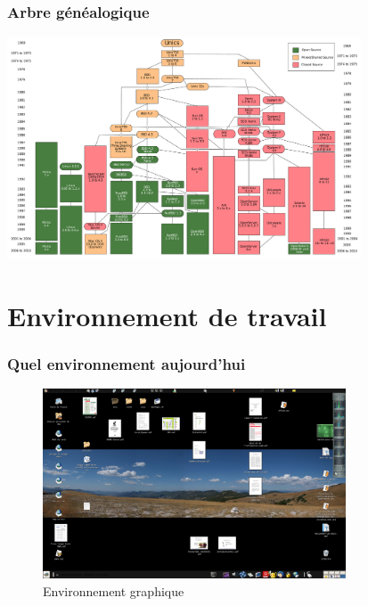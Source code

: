 \documentclass[handout,10pt]{beamer}
\begin{document}
\frame
{
    \frametitle{Arbre généalogique}

    \begin{center}
        \includegraphics[width=10.5cm]{images/Unix_history-simple.pdf}
    \end{center}
}


\section{Environnement de travail}
\frame
{
    \frametitle{Quel environnement aujourd'hui}

     \begin{center}

        \begin{figure}
            \includegraphics[width=9cm]{images/ecran.png}
            \caption{Environnement graphique}
        \end{figure}

    \end{center}
}
\end{document}
